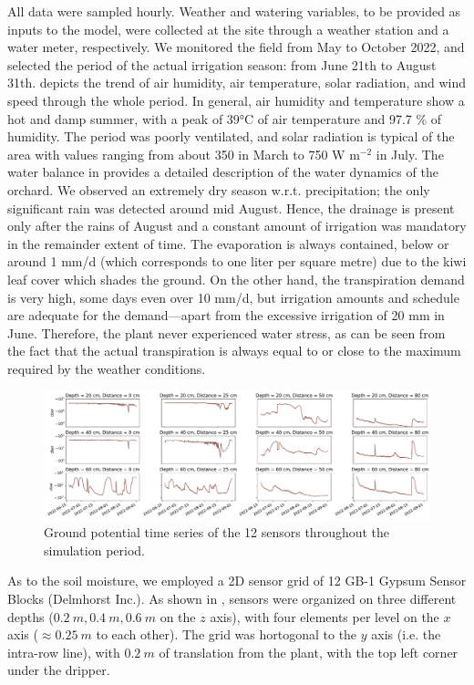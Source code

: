All data were sampled hourly.
Weather and watering variables, to be provided as inputs to the model, were  collected at the site through a weather station and a water meter, respectively.
We monitored the field from May to October 2022, and selected the period of the actual irrigation season: from June 21th to August 31th.
 depicts the trend of air humidity, air temperature, solar radiation, and wind speed through the whole period.
In general, air humidity and temperature show a hot and damp summer, with a peak of 39°C of air temperature and 97.7 \% of humidity.
The period was poorly ventilated, and solar radiation is typical of the area with values ranging from about 350  in March to 750 W m$^{-2}$ in July.
The water balance in  provides a detailed description of the water dynamics of the orchard.
%
We observed an extremely dry season w.r.t. precipitation; the only significant rain was detected around mid August.
%
Hence, the drainage is present only after the rains of August and a constant amount of irrigation was mandatory in the remainder extent of time.
%
The evaporation is always contained, below or around 1 mm/d (which corresponds to one liter per square metre) due to the kiwi leaf cover which shades the ground.
%
On the other hand, the transpiration demand is very high, some days even over 10 mm/d, but irrigation amounts and schedule are adequate for the demand---apart from the excessive irrigation of 20 mm in June.
%
Therefore, the plant never experienced water stress, as can be seen from the fact that the actual transpiration  is always equal to or close to the maximum required by the weather conditions.

\begin{figure}[t]
    \centering
    \includegraphics[scale=.3]{chapters/physics-aware/orchard/img/ground_potential.pdf}
    \caption{Ground potential time series of the 12 sensors throughout the simulation period. }
    \label{orchard-fig:ground_potential}
\end{figure}

As to the soil moisture, we employed a 2D sensor grid of 12 GB-1 Gypsum Sensor Blocks (Delmhorst Inc.). As shown in , sensors were organized on three different depths ($0.2~m, 0.4~m, 0.6~m$ on the $z$ axis), with four elements per level on the $x$ axis ($\approx 0.25~m$ to each other). The grid was hortogonal to the $y$ axis (i.e. the intra-row line), with $0.2~m$ of translation from the plant, with the top left corner under the dripper.


